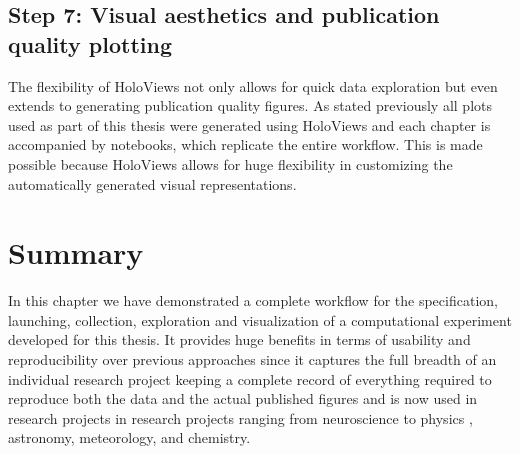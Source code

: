 \subsection{Step 7: Visual aesthetics and publication quality plotting}

The flexibility of HoloViews not only allows for quick data
exploration but even extends to generating publication quality
figures. As stated previously all plots used as part of this thesis
were generated using HoloViews and each chapter is accompanied by
notebooks, which replicate the entire workflow. This is made possible
because HoloViews allows for huge flexibility in customizing the
automatically generated visual representations.

\section{Summary}

In this chapter we have demonstrated a complete workflow for the
specification, launching, collection, exploration and visualization of
a computational experiment developed for this thesis. It provides huge
benefits in terms of usability and reproducibility over previous
approaches since it captures the full breadth of an individual
research project keeping a complete record of everything required to
reproduce both the data and the actual published figures and is now
used in research projects in research projects ranging from
neuroscience \citep{Keemink2015} to physics \citep{Nijholt2015,
  Tenner2016}, astronomy, meteorology, and chemistry.

